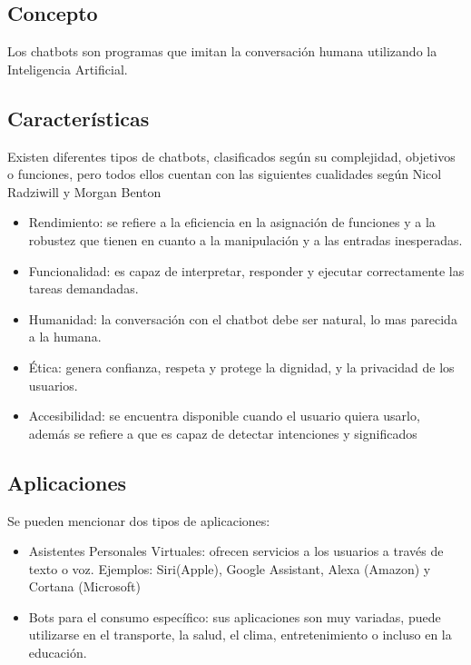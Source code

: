





\subsection{Concepto}
Los chatbots son programas que imitan la conversación humana utilizando la Inteligencia
Artificial.\cite{UniversityRelatedFAQS}
\subsection{Características}
Existen diferentes tipos de chatbots, clasificados según su complejidad, objetivos o funciones,
pero todos ellos cuentan con las siguientes cualidades según Nicol Radziwill y Morgan Benton
\cite{evaluating_quality}
\begin{itemize}
	\item Rendimiento: se refiere a la eficiencia en la asignación de funciones y a la robustez que
	      tienen en cuanto a la manipulación y a las entradas inesperadas.
	\item Funcionalidad: es capaz de interpretar, responder y ejecutar	correctamente las tareas
	      demandadas.
	\item Humanidad: la conversación con el chatbot debe ser natural, lo mas parecida a la humana.
	\item Ética: genera confianza, respeta y protege la dignidad, y la privacidad de los usuarios.
	\item Accesibilidad: se encuentra disponible cuando el usuario quiera usarlo, además se refiere
	      a que es capaz de detectar intenciones y significados
\end{itemize}

\subsection{Aplicaciones}
Se pueden mencionar dos tipos de aplicaciones:
\begin{itemize}
	\item Asistentes Personales Virtuales: ofrecen servicios a los usuarios a través de texto o
	      voz. Ejemplos: Siri(Apple), Google Assistant, Alexa (Amazon) y Cortana (Microsoft)
	\item Bots para el consumo específico: sus aplicaciones son muy variadas, puede utilizarse en
	      el transporte, la salud, el clima, entretenimiento o incluso en la educación.
\end{itemize}
